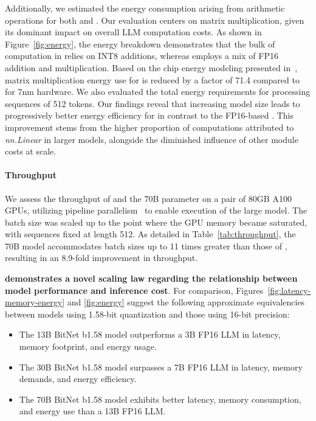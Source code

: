 Additionally, we estimated the energy consumption arising from arithmetic operations for both  and . Our evaluation centers on matrix multiplication, given its dominant impact on overall LLM computation costs. As shown in Figure~\ref{fig:energy}, the energy breakdown demonstrates that the bulk of computation in  relies on INT8 additions, whereas  employs a mix of FP16 addition and multiplication. Based on the chip energy modeling presented in~\cite{energycost, pokebnn}, matrix multiplication energy use for  is reduced by a factor of 71.4 compared to  for 7nm hardware. We also evaluated the total energy requirements for processing sequences of 512 tokens. Our findings reveal that increasing model size leads to progressively better energy efficiency for  in contrast to the FP16-based . This improvement stems from the higher proportion of computations attributed to \emph{nn.Linear} in larger models, alongside the diminished influence of other module costs at scale.

\paragraph{Throughput}

We assess the throughput of  and the 70B parameter  on a pair of 80GB A100 GPUs, utilizing pipeline parallelism~\cite{gpipe} to enable execution of the large  model. The batch size was scaled up to the point where the GPU memory became saturated, with sequences fixed at length 512. As detailed in Table~\ref{tab:throughput}, the 70B  model accommodates batch sizes up to 11 times greater than those of , resulting in an 8.9-fold improvement in throughput.

\textbf{ demonstrates a novel scaling law regarding the relationship between model performance and inference cost}. For comparison, Figures~\ref{fig:latency-memory-energy} and \ref{fig:energy} suggest the following approximate equivalencies between models using 1.58-bit quantization and those using 16-bit precision:

\begin{itemize}
    \item The 13B BitNet b1.58 model outperforms a 3B FP16 LLM in latency, memory footprint, and energy usage.
    \item The 30B BitNet b1.58 model surpasses a 7B FP16 LLM in latency, memory demands, and energy efficiency.
    \item The 70B BitNet b1.58 model exhibits better latency, memory consumption, and energy use than a 13B FP16 LLM.
\end{itemize}

